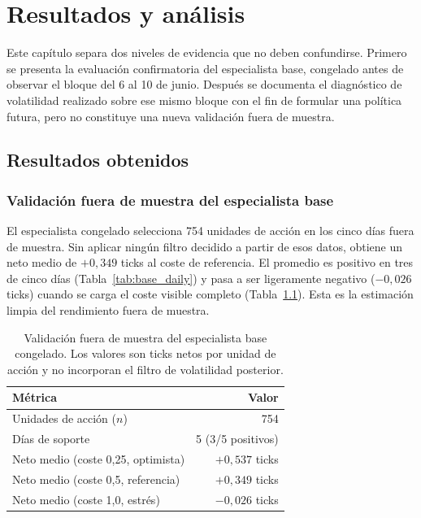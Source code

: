 %
\chapter{Resultados y análisis}
\label{ch::resultados}

Este capítulo separa dos niveles de evidencia que no deben confundirse. Primero se presenta
la evaluación confirmatoria del especialista base, congelado antes de observar el bloque del
6 al 10 de junio. Después se documenta el diagnóstico de volatilidad realizado sobre ese mismo
bloque con el fin de formular una política futura, pero no constituye una nueva validación
fuera de muestra.

\section{Resultados obtenidos}

\subsection{Validación fuera de muestra del especialista base}

El especialista congelado selecciona 754 unidades de acción en los cinco días fuera de
muestra. Sin aplicar ningún filtro decidido a partir de esos datos, obtiene un neto medio de
$+0{,}349$ ticks al coste de referencia. El promedio es positivo en tres de cinco días
(Tabla~\ref{tab:base_daily}) y pasa a ser ligeramente negativo ($-0{,}026$ ticks) cuando se
carga el coste visible completo (Tabla~\ref{tab:fresh}). Esta es la estimación limpia del rendimiento fuera de muestra.

\begin{table}[h]
\centering
\caption{Validación fuera de muestra del especialista base congelado. Los valores son ticks
netos por unidad de acción y no incorporan el filtro de volatilidad posterior.}
\label{tab:fresh}
\begin{tabular}{lr}
\toprule
\textbf{Métrica} & \textbf{Valor} \\
\midrule
Unidades de acción ($n$)                  & 754 \\
Días de soporte                          & 5 (3/5 positivos) \\
Neto medio (coste 0,25, optimista)         & $+0{,}537$ ticks \\
Neto medio (coste 0,5, referencia)         & $+0{,}349$ ticks \\
Neto medio (coste 1,0, estrés)             & $-0{,}026$ ticks \\
\bottomrule
\end{tabular}
\end{table}

